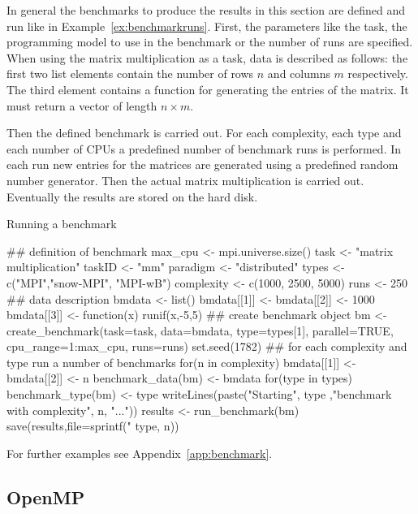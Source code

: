 In general the benchmarks to produce the results in this
section are defined and run like in
Example~\ref{ex:benchmarkruns}. First, the parameters like the task,
the programming model to use in the benchmark or the number of runs
are specified. When using 
the matrix multiplication as a task, data is described as follows: the
first two list elements contain the number of rows $n$ and columns $m$
respectively. The
third element contains a function for generating the entries of the
matrix. It must return a vector of length $n \times m$.

Then the defined benchmark is carried out. For each complexity,
each type and each number of CPUs a predefined number of benchmark runs is
performed. In each run new entries for the matrices are generated
using a predefined random number generator. Then the actual matrix
multiplication is carried out. 
Eventually the results are stored on the hard disk. 

\begin{Example} Running a benchmark
\label{ex:benchmarkruns}
\begin{Scode}

## definition of benchmark
max_cpu <- mpi.universe.size()
task <- "matrix multiplication"
taskID <- "mm"
paradigm <- "distributed"
types <- c("MPI","snow-MPI", "MPI-wB")
complexity <- c(1000, 2500, 5000)
runs <- 250
## data description
bmdata <- list()
bmdata[[1]] <- bmdata[[2]] <- 1000
bmdata[[3]] <- function(x){
  runif(x,-5,5)
}
## create benchmark object
bm <- create_benchmark(task=task, data=bmdata,
                       type=types[1], parallel=TRUE,
                       cpu_range=1:max_cpu, runs=runs)
set.seed(1782)
## for each complexity and type run a number of benchmarks
for(n in complexity){
  bmdata[[1]] <- bmdata[[2]] <- n
  benchmark_data(bm) <- bmdata
  for(type in types){
    benchmark_type(bm) <- type
    writeLines(paste("Starting", type ,"benchmark with complexity",
               n, "..."))
    results <- run_benchmark(bm)
    save(results,file=sprintf("%
                               type, n))
  }
}

\end{Scode}
\end{Example}
For further examples see Appendix~\ref{app:benchmark}.

\subsection{OpenMP}

